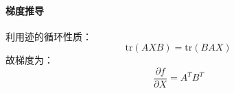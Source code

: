 \paragraph{梯度推导}  
利用迹的循环性质：
\[
\text{tr}(AXB) = \text{tr}(B A X)
\]
故梯度为：
\[
\frac{\partial f}{\partial X} = A^T B^T
\]
